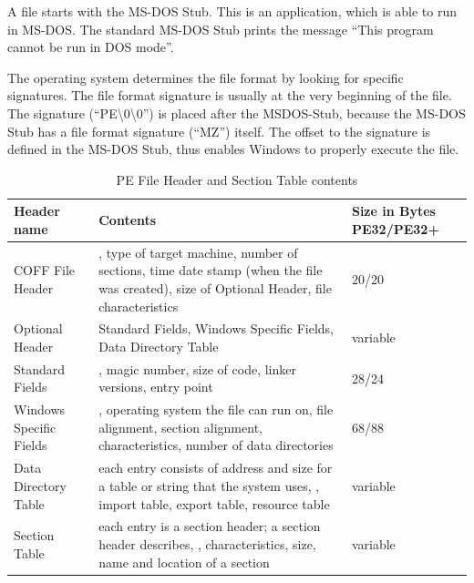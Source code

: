 A \PE{} file starts with the MS-DOS Stub. This is an application, which is able to run in MS-DOS. The standard MS-DOS Stub prints the message \enquote{This program cannot be run in DOS mode}. 

The operating system determines the file format by looking for specific signatures. The file format signature is usually at the very beginning of the file. The \PE{} signature (\enquote{PE\textbackslash{}0\textbackslash{}0}) is placed after the MSDOS-Stub, because the MS-DOS Stub has a file format signature (\enquote{MZ}) itself. The offset to the \PE{} signature is defined in the MS-DOS Stub, thus enables Windows to properly execute the \PE{} file.

\renewcommand{\arraystretch}{1.5}
\begin{table}[h]
	\begin{center}
		\begin{tabular}{p{} p{} p{}}
			\toprule
			Header name			& Contents & Size in Bytes PE32/PE32+ \\
			\midrule
			COFF File Header	&  \ia{}, type of target machine, number of sections, time date stamp (when the file was created), size of Optional Header, file characteristics & 20/20\\

		  Optional Header			& Standard Fields, Windows Specific Fields, Data Directory Table & variable\\
      \midrule
      Standard Fields &  \ia{}, magic number, size of code, linker versions, entry point & 28/24\\
			Windows Specific Fields	& \ia{}, operating system the file can run on, file alignment, section alignment, \DLL{} characteristics, number of data directories & 68/88 \\
			Data Directory Table	& each entry consists of address and size for a table or string that the system uses, \eg{}, import table, export table, resource table & variable\\
			\midrule
      Section Table &  each entry is a section header; a section header describes, \ia{}, characteristics, size, name and location of a section & variable\\
			\bottomrule
		\end{tabular}
	\end{center}
	\caption[PE File Header contents]{PE File Header and Section Table contents}
	\label{tbl:peheader}
\end{table}

